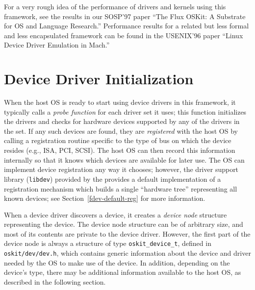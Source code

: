 
For a very rough idea of the performance of
drivers and kernels using this framework,
see the results in our SOSP'97 paper
``The Flux OSKit: A Substrate for OS and Language Research.''
Performance results for a related but less formal and less encapsulated framework
can be found in the USENIX'96 paper
``Linux Device Driver Emulation in Mach.''


\section{Device Driver Initialization}

When the host OS is ready to start using device drivers in this framework,
it typically calls a \emph{probe function} for each driver set it uses;
this function initializes the drivers
and checks for hardware devices supported by any of the drivers in the set.
If any such devices are found,
they are \emph{registered} with the host OS
by calling a registration routine specific to the type of bus
on which the device resides (e.g., ISA, PCI, SCSI).
The host OS can then record this information internally
so that it knows which devices are available for later use.
The OS can implement device registration any way it chooses;
however, the driver support library ({\tt libdev}) provided by the \oskit{}
provides a default implementation of a registration mechanism
which builds a single ``hardware tree'' representing all known devices;
see Section~\ref{fdev-default-reg} for more information.

When a device driver discovers a device,
it creates a \emph{device node} structure representing the device.
The device node structure can be of arbitrary size,
and most of its contents are private to the device driver.
However, the first part of the device node
is always a structure of type {\tt oskit_device_t},
defined in {\tt oskit/dev/dev.h},
which contains generic information about the device and driver
needed by the OS to make use of the device.
In addition, depending on the device's type,
there may be additional information available to the host OS,
as described in the following section.

